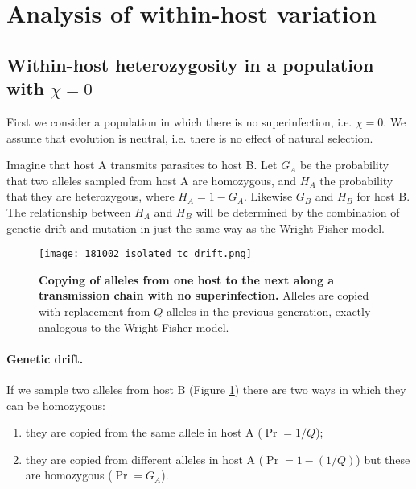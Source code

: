 \documentclass[_main.tex]{subfiles}
\begin{document}

\section{Analysis of within-host variation}

\subsection{Within-host heterozygosity in a population with \texorpdfstring{$\chi=0$}{chi=0}}
\label{supp_whh_chi_0}

First we consider a population in which there is no superinfection, i.e. $\chi = 0$.  We assume that evolution is neutral, i.e. there is no effect of natural selection.  

Imagine that host A transmits parasites to host B. Let $G_A$ be the probability that two alleles sampled from host A are homozygous, and $H_A$ the probability that they are heterozygous, where $H_A = 1 - G_A$.  Likewise $G_B$ and $H_B$ for host B.  The relationship between $H_A$ and $H_B$ will be determined by the combination of genetic drift and mutation in just the same way as the Wright-Fisher model.   

\begin{figure}[h!]
\centering
\texttt{[image: 181002\_isolated\_tc\_drift.png]}
\caption{\textbf{Copying of alleles from one host to the next along a transmission chain with no superinfection.}  Alleles are copied with replacement from $Q$ alleles in the previous generation, exactly analogous to the Wright-Fisher model.}
\label{fig:supp_hahb}
\end{figure}

\paragraph{Genetic drift.}  If we sample two alleles from host B (Figure \ref{fig:supp_hahb}) there are two ways in which they can be homozygous:

\begin{enumerate}[noitemsep]

\item they are copied from the same allele in host A ($ \Pr = 1 / Q $);
\item they are copied from different alleles in host A ($\Pr = 1 - (1/Q) $) but these are homozygous ($\Pr = G_A$).

\end{enumerate}
 
\end{document}
